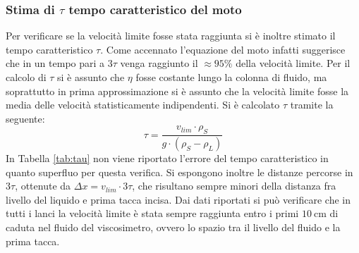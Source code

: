 \documentclass[a4paper,11pt,oneside]{article}
\begin{document}
\subsubsection*{Stima di $\tau$ tempo caratteristico del moto}
Per verificare se la velocità limite fosse stata raggiunta si è inoltre stimato il tempo caratteristico $\tau$. Come accennato l'equazione del moto infatti suggerisce che in un tempo pari a $3\tau$ venga raggiunto il $\approx 95\%$ della velocità limite.
Per il calcolo di $\tau$ si è assunto che $\eta$ fosse costante lungo la colonna di fluido, ma soprattutto in prima approssimazione si è assunto che la velocità limite fosse la media delle velocità statisticamente indipendenti.
Si è calcolato $\tau$ tramite la seguente:
\begin{equation*}
    \tau = \frac{v_{lim} \cdot \rho_{S}}{g \cdot (\rho_{S} - \rho_{L})}
\end{equation*}
In Tabella \ref{tab:tau} non viene riportato l'errore del tempo caratteristico in quanto superfluo per questa verifica. Si espongono inoltre le distanze percorse in $3\tau$, ottenute da $\Delta x=v_{lim} \cdot 3 \tau$, che risultano sempre minori della distanza fra livello del liquido e prima tacca incisa.
Dai dati riportati si può verificare che in tutti i lanci la velocità limite è stata sempre raggiunta entro i primi $\SI{10}{\centi\meter}$ di caduta nel fluido del viscosimetro, ovvero lo spazio tra il livello del fluido e la prima tacca.%
\begin{table}[h!]
\centering
{}
    \caption{Tempo caratteristico $\tau$}
    \label{tab:tau}
\end{table}
\end{document}
